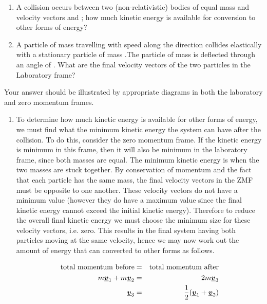 
\begin{problem} %
 {
 \begin{enumerate}
\item A collision occurs between two (non-relativistic) bodies of equal mass  and velocity vectors  and ; how much kinetic energy is available for conversion to other forms of energy? 
 \item A particle of mass  travelling with speed  along the  direction collides elastically with a stationary particle of mass .The particle of mass  is deflected through an angle of .  What are the final velocity vectors of the two particles in the Laboratory frame?
\end{enumerate} 
Your answer should be illustrated by appropriate diagrams in both the laboratory and zero momentum frames.}
{}
{
\begin{enumerate}
\item To determine how much kinetic energy is available for other forms of energy, we must find what the minimum kinetic energy the system can have after the collision. To do this, consider the zero momentum frame. If the kinetic energy is minimum in this frame, then it will also be minimum in the laboratory frame, since both masses are equal. The minimum kinetic energy is when the two masses are stuck together. By conservation of momentum and the fact that each particle has the same mass, the final velocity vectors in the ZMF must be opposite to one another. These velocity vectors do not have a minimum value (however they do have a maximum value since the final kinetic energy cannot exceed the initial kinetic energy). Therefore to reduce the overall final kinetic energy we must choose the minimum size for these velocity vectors, i.e. zero. This results in the final system having both particles moving at the same velocity, hence we may now work out the amount of energy that can converted to other forms as follows.

\begin{eqnarray*}
\text{total~momentum~before} &=& \text{total~momentum~after} \\
m\mathit{\underline{\boldsymbol{v}}}_{1}+m\mathit{\underline{\boldsymbol{v}}}_{2} &=& 2m\mathit{\underline{\boldsymbol{v}}}_{3} \\
\mathit{\underline{\boldsymbol{v}}}_{3} &=& \frac{1}{2}(\mathit{\underline{\boldsymbol{v}}}_{1}+\mathit{\underline{\boldsymbol{v}}}_{2})
\end{eqnarray*}


\end{enumerate}}
\end{problem}
